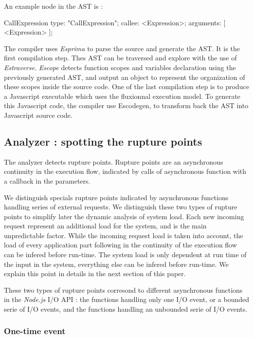 An example node in the AST is :

\begin{code}[Javascript, caption={Example of an AST node},label={lst:astnode}]
CallExpression {
    type: "CallExpression";
    callee: <Expression>;
    arguments: [ <Expression> ];
}
\end{code}

The compiler uses \textit{Esprima} to parse the source and generate the AST.
It is the first compilation step.
Thes AST can be traversed and explore with the use of \textit{Estraverse}.
\textit{Escope} detects function scopes and variables declaration using the previously generated AST, and output an object to represent the organization of these scopes inside the source code.
One of the last compilation step is to produce a Javascript executable which uses the fluxionnal execution model.
To generate this Javascript code, the compiler use Escodegen, to transform back the AST into Javascript source code.

\subsection{Analyzer : spotting the rupture points}

The analyzer detects rupture points.
Rupture points are an asynchronous continuity in the execution flow, indicated by calls of asynchronous function with a callback in the parameters.

We distinguish specials rupture points indicated by asynchronous functions handling series of external requests.
We distinguish these two types of rupture points to simplify later the dynamic analysis of system load.
Each new incoming request represent an additional load for the system, and is the main unpredictable factor.
While the incoming request load is taken into account, the load of every application part following in the continuity of the execution flow can be infered before run-time. 
The system load is only dependent at run time of the input in the system, everything else can be infered before run-time.
We explain this point in details in the next section of this paper.

These two types of rupture points corresond to different asynchronous functions in the \textit{Node.js} I/O API : the functions handling only one I/O event, or a bounded serie of I/O events, and the functions handling an unbounded serie of I/O events.

\subsubsection{One-time event} \label{sss:post}

